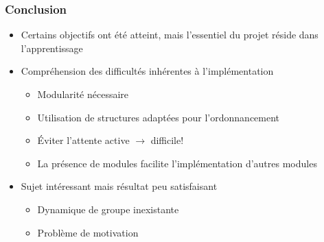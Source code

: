 \documentclass{beamer}
\begin{document}
\begin{frame}
  \frametitle{Conclusion}
  \begin{itemize}
  \item Certains objectifs ont été atteint, mais l'essentiel du projet réside
    dans l'apprentissage
  \item Compréhension des difficultés inhérentes à l'implémentation
    \begin{itemize}
    \item Modularité nécessaire
    \item Utilisation de structures adaptées pour l'ordonnancement
    \item Éviter l'attente active $\rightarrow$ difficile!
    \item La présence de modules facilite l'implémentation d'autres modules 
    \end{itemize}
  \item Sujet intéressant mais résultat peu satisfaisant
    \begin{itemize}
    \item Dynamique de groupe inexistante
    \item Problème de motivation
    \end{itemize}
  \end{itemize}
\end{frame}


 
\end{document}
